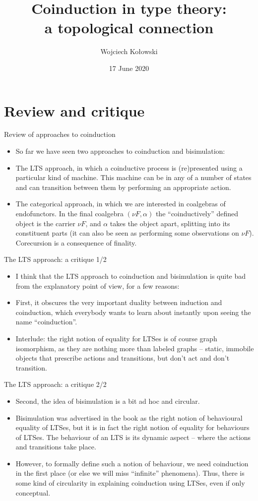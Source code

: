 \documentclass{beamer}
\title{Coinduction in type theory:\\a topological connection}
\author{Wojciech Kołowski}
\date{17 June 2020}
\begin{document}
\frame{\titlepage}
\frame{\tableofcontents}

\section{Review and critique}

\begin{frame}{Review of approaches to coinduction}
\begin{itemize}
	\item So far we have seen two approaches to coinduction and bisimulation:
	\item The LTS approach, in which a coinductive process is (re)presented using a particular kind of machine. This machine can be in any of a number of states and can transition between them by performing an appropriate action.
	\item The categorical approach, in which we are interested in coalgebras of endofunctors. In the final coalgebra $(\nu F, \alpha)$ the ``coinductively'' defined object is the carrier $\nu F$, and $\alpha$ takes the object apart, splitting into its constituent parts (it can also be seen as performing some observations on $\nu F$). Corecursion is a consequence of finality.
\end{itemize}
\end{frame}

\begin{frame}{The LTS approach: a critique 1/2}
\begin{itemize}
	\item I think that the LTS approach to coinduction and bisimulation is quite bad from the explanatory point of view, for a few reasons:
	\item First, it obscures the very important duality between induction and coinduction, which everybody wants to learn about instantly upon seeing the name ``coinduction''.
	\item Interlude: the right notion of equality for LTSes is of course graph isomorphism, as they are nothing more than labeled graphs -- static, immobile objects that prescribe actions and transitions, but don't act and don't transition.
\end{itemize}
\end{frame}

\begin{frame}{The LTS approach: a critique 2/2}
\begin{itemize}
	\item Second, the idea of bisimulation is a bit ad hoc and circular.
	\item Bisimulation was advertised in the book as the right notion of behavioural equality of LTSes, but it is in fact the right notion of equality for behaviours of LTSes. The behaviour of an LTS is its dynamic aspect -- where the actions and transitions take place.
	\item However, to formally define such a notion of behaviour, we need coinduction in the first place (or else we will miss ``infinite'' phenomena). Thus, there is some kind of circularity in explaining coinduction using LTSes, even if only conceptual.
\end{itemize}
\end{frame}
\end{document}
